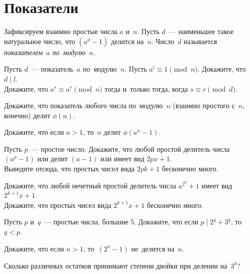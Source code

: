 
\section*{Показатели}


Зафиксируем взаимно простые числа $a$ и~$n$.
Пусть $d$~--- наименьшее такое натуральное число, что $(a^d - 1)$ делится
на~$n$.
Число~$d$ называется \emph{показателем~$a$ по~модулю~$n$}.

\begin{problems}

\item
\sp
Пусть $d$~--- показатель~$a$ по~модулю~$n$.
Пусть $a^l \equiv 1 \pmod{n}$.
Докажите, что $d \mid l$.
\\
\sp
Докажите, что $a^s \equiv a^r \pmod{n}$ тогда и~только тогда, когда
$s \equiv r \pmod{d}$.

\item
Докажите, что показатель любого числа по~модулю~$n$ (взаимно простого с~$n$,
конечно) делит $\phi(n)$.

\item
Докажите, что если $a > 1$, то~$n$ делит $\phi(a^n - 1)$.

\item
\sp
Пусть $p$~--- простое число.
Докажите, что любой простой делитель числа $(a^p - 1)$ или делит $(a - 1)$ или
имеет вид $2 p x + 1$.
\\
\sp
Выведите отсюда, что простых чисел вида $2 p k + 1$ бесконечно много.

\item
\sp
Докажите, что любой нечетный простой делитель числа $a^{2^{k}} + 1$ имеет вид
$2^{k+1} x + 1$.
\\
\sp
Докажите, что простых чисел вида $2^{k+1} x + 1$ бесконечно много.

\item
Пусть $p$ и~$q$~--- простые числа, большие 5.
Докажите, что если $p \mid 2^q + 3^q$, то~$q < p$.

\item
Докажите, что если $n > 1$, то~$(2^n - 1)$ не~делится на~$n$. 

\item
Сколько различных остатков принимают степени двойки при делении на~$3^k$?

\end{problems}

